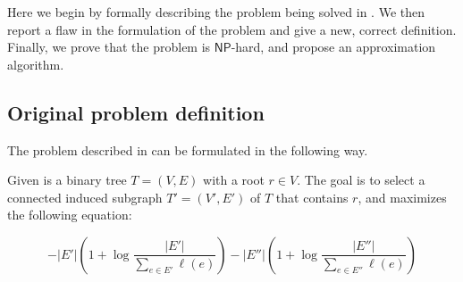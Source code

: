 \documentclass{llncs}
\begin{document}
Here we begin by formally describing the problem being solved in \cite{PTP}. We
then report a flaw in the formulation of the problem and give a new, correct
definition. Finally, we prove that the problem is $\mathsf{NP}$-hard, and
propose an approximation algorithm.

\subsection{Original problem definition}

The problem described in \cite{PTP} can be formulated in the following way.

Given is a binary tree $T=(V,E)$ with a root $r \in V$. The goal is to select a connected induced subgraph $T'=(V',E')$ of $T$
that contains $r$, and maximizes the following equation:

$$ - |E'|(1 + \log \frac{|E'|}{\sum_{e \in E'}\ell(e)}) - |E''|(1 + \log \frac{|E''|}{\sum_{e \in E''}\ell(e)})$$




\end{document}
